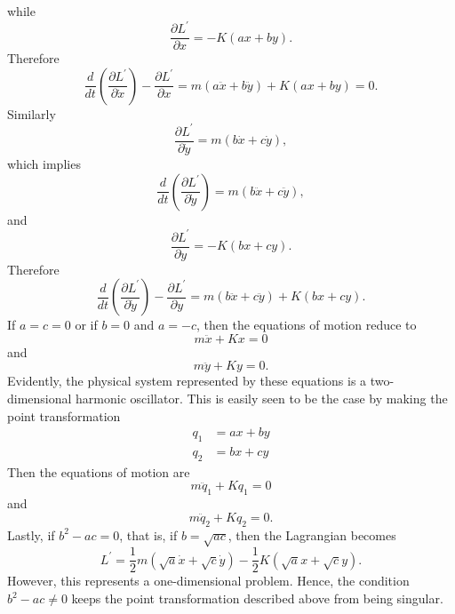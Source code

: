 \begin{questions}
\begin{solution}
\[\]
while
\[
\frac{\partial L^\prime}{\partial x} = -K ( ax + by ).
\]
Therefore
\[
\frac{d}{dt} \left( \frac{\partial L^\prime}{\partial \dot{x}} \right) - \frac{\partial L^\prime}{\partial x} = m ( a \ddot{x} + b \ddot{y} ) + K ( a x + b y ) = 0.
\]
Similarly
\[
\frac{\partial L^\prime}{\partial \dot{y}} = m ( b \dot{x} + c \dot{y} ),
\]
which implies
\[
\frac{d}{dt} \left( \frac{\partial L^\prime}{\partial \dot{y}} \right) = m ( b \ddot{x} + c \ddot{y} ),
\]
and
\[
\frac{\partial L^\prime}{\partial y} = -K ( b x + c y ).
\]
Therefore
\[
\frac{d}{dt} \left( \frac{\partial L^\prime}{\partial \dot{y}} \right) - \frac{\partial L^\prime}{\partial y} = m ( b \ddot{x} + c \ddot{y} ) + K ( b x + c y ).
\]
If $a = c = 0$ or if $b = 0$ and $a = -c$, then the equations of motion reduce to
\[
m \ddot{x} + K x = 0
\]
and
\[
m \ddot{y} + K y = 0.
\]
Evidently, the physical system represented by these equations is a two-dimensional harmonic oscillator. This is easily seen to be the case by making the point transformation
\begin{align*}
q_1 &= a x + b y \\
q_2 &= b x + c y
\end{align*}
Then the equations of motion are
\[
m \ddot{q}_1 + K q_1 = 0
\]
and
\[
m \ddot{q}_2 + K q_2 = 0.
\]
Lastly, if $b^2 - a c = 0$, that is, if $ b = \sqrt{a c}$, then the Lagrangian becomes
\[
L^\prime = \frac{1}{2} m ( \sqrt{a} \dot{x} + \sqrt{c} \dot{y} ) - \frac{1}{2} K ( \sqrt{a} x + \sqrt{c} y ).
\]
However, this represents a one-dimensional problem. Hence, the condition $b^2 - a c \neq 0$ keeps the point transformation described above from being singular.
\end{solution}


\end{questions}
